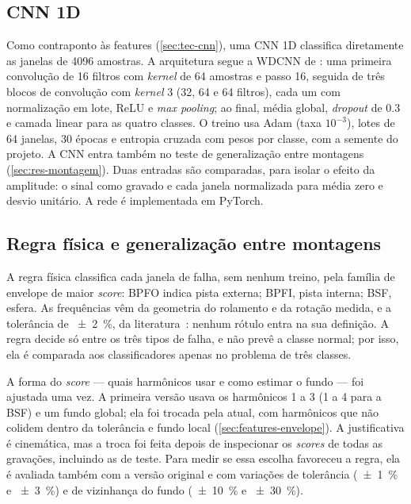 \subsection{CNN 1D}
\label{sec:met-cnn}

Como contraponto às features (\autoref{sec:tec-cnn}), uma CNN 1D
classifica diretamente as janelas de 4096 amostras. A arquitetura segue a WDCNN
de \textcite{zhang2017}: uma primeira convolução de 16 filtros com
\emph{kernel} de 64 amostras e passo 16, seguida de três blocos de convolução
com \emph{kernel} 3 (32, 64 e 64 filtros), cada um com normalização em lote,
ReLU e \emph{max pooling}; ao final, média global, \emph{dropout} de
\num{0.3} e camada linear para as quatro classes. O treino usa Adam (taxa
$10^{-3}$), lotes de 64 janelas, 30 épocas e entropia cruzada com pesos por
classe, com a semente do projeto. A CNN entra também no teste de generalização
entre montagens (\autoref{sec:res-montagem}). Duas entradas são comparadas, para isolar
o efeito da amplitude: o sinal como gravado e cada janela normalizada para média
zero e desvio unitário. A rede é implementada em PyTorch.

\subsection{Regra física e generalização entre montagens}
\label{sec:met-regra-fisica}

A regra física classifica cada janela de falha, sem nenhum treino, pela família
de envelope de maior \emph{score}: BPFO indica pista externa; BPFI, pista
interna; BSF, esfera. As frequências vêm da geometria do rolamento e da rotação
medida, e a tolerância de \SI{\pm 2}{\percent}, da
literatura~\cite{randall2011tutorial,smith2015}:
nenhum rótulo entra na sua definição. A regra decide só entre os três tipos de
falha, e não prevê a classe normal; por isso, ela é comparada aos classificadores
apenas no problema de três classes.

A forma do \emph{score} --- quais harmônicos usar e como estimar o fundo --- foi
ajustada uma vez. A primeira versão usava os harmônicos 1 a 3 (1 a 4 para a BSF)
e um fundo global; ela foi trocada pela atual, com harmônicos que não colidem
dentro da tolerância e fundo local (\autoref{sec:features-envelope}). A
justificativa é cinemática, mas a troca foi feita depois de inspecionar os
\emph{scores} de todas as gravações, incluindo as de teste. Para medir se essa
escolha favoreceu a regra, ela é avaliada também com a versão original e com
variações de tolerância (\SI{\pm 1}{\percent} e \SI{\pm 3}{\percent}) e de
vizinhança do fundo (\SI{\pm 10}{\percent} e \SI{\pm 30}{\percent}).

